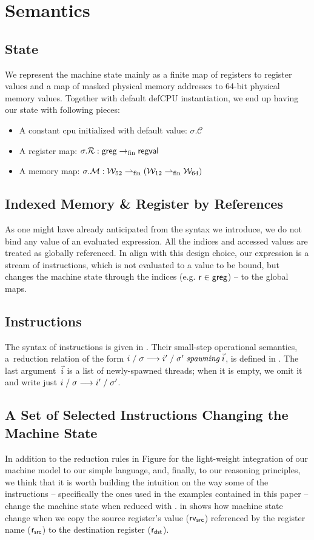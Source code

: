 \section{Semantics}
\label{sec:semantics}
\subsection{State}
\label{sec:state}
We represent the machine state mainly as a finite map of registers to register values and a map of masked physical memory addresses to 64-bit physical memory values. Together with default def\textsf{CPU} instantiation, we end up having our state with following pieces:
\begin{itemize}
\item A constant cpu initialized with default value: $\sigma.\mathcal{C}$
\item A register map: $\sigma.\mathcal{R}: \mathsf{greg} \rightarrow_{\textrm{fin}} \mathsf{regval} $
\item A memory map: $\sigma.\mathcal{M}: \mathcal{W}_{52} \rightharpoonup_{\textrm{fin}} (\mathcal{W}_{12} \rightharpoonup_{\textrm{fin}} \mathcal{W}_{64} )$
\end{itemize}
\subsection{Indexed Memory \& Register by References}
\label{sec:}
As one might have already anticipated from the syntax we introduce, we do not bind any value of an evaluated expression. All the indices and accessed values are treated as globally referenced. In align with this design choice, our expression is a stream of instructions, which is not evaluated to a value to be bound, but changes the machine state through the indices (e.g. $\mathsf{r}\in\mathsf{greg}$) -- to the global maps. 
\subsection{Instructions}
\label{sec:instrsemantics}
The syntax of instructions is given in . Their
small-step operational semantics, a~reduction relation of the form
$i\;/\;\sigma\longrightarrow i'\;/\;\sigma'\mathrel{\textit{spawning}}\vec{i}$,
is defined in .
%
The last argument~$\vec{i}$ is a list of newly-spawned threads;
when it is empty, we omit it
and write just $i\;/\;\sigma\longrightarrow i'\;/\;\sigma'$.
\subsection{A Set of Selected Instructions Changing the Machine State}
\label{sec:selectedinstrsemantics}
In addition to the reduction rules in Figure  for the light-weight integration of our machine model to our simple language, and, finally, to our reasoning principles, we think that it is worth building the intuition on the way some of the instructions -- specifically the ones used in the examples contained in this paper -- change the machine state when reduced with .  in  shows how machine state change when we copy the source register's value ($\mathsf{rv}_{\textsf{src}}$) referenced by the register name ($\mathsf{r}_{\textsf{src}}$) to the destination register ($\mathsf{r}_{\textsf{dst}}$). 


